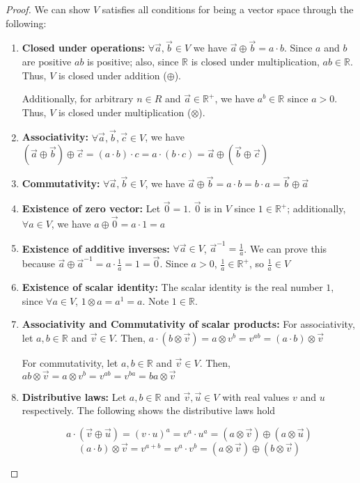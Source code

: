 \documentclass[11pt]{article}
\newcommand{\R}{\mathbb{R}}
\begin{document}
\begin{proof}
We can show $V$ satisfies all conditions for being a vector space through the following:

\begin{enumerate}

\item \textbf{Closed under operations:} $\forall \vec{a}, \vec{b} \in V$ we have $\vec{a}\oplus \vec{b} = a \cdot b$. Since $a$ and $b$ are positive $ab$ is positive; also, since $\R$ is closed under multiplication, $ab \in \R$. Thus, $V$ is closed under addition ($\oplus$).

Additionally, for arbitrary $n \in R$ and $\vec{a}\in \R^+$, we have $a^b \in \R$ since $a>0$. Thus, $V$ is closed under multiplication ($\otimes$).

\item \textbf{Associativity:} $\forall \vec{a}, \vec{b}, \vec{c} \in V$, we have $(\vec{a}\oplus \vec{b}) \oplus \vec{c} = (a\cdot b)\cdot c = a\cdot (b\cdot c) = \vec{a}\oplus (\vec{b} \oplus \vec{c})$ 

\item \textbf{Commutativity:} $\forall \vec{a}, \vec{b} \in V$, we have $\vec{a} \oplus \vec{b} = a\cdot b = b \cdot a = \vec{b} \oplus \vec{a}$ 

\item \textbf{Existence of zero vector:} Let $\vec{0} = 1$. $\vec{0}$ is in $V$ since $1\in \R^+$; additionally, $\forall a \in V$, we have $a \oplus \vec{0} = a \cdot 1 = a$

\item \textbf{Existence of additive inverses:} $\forall \vec{a} \in V$, $\vec{a}^{-1}=\frac{1}{a}$. We can prove this because $\vec{a} \oplus \vec{a}^{-1} = a \cdot \frac{1}{a} = 1 = \vec{0}$. Since $a > 0$, $\frac{1}{a} \in \R^{+}$, so $\frac{1}{a} \in V$

\item \textbf{Existence of scalar identity:} The scalar identity is the real number $1$, since $\forall a \in V$, $1 \otimes a = a^1 = a$. Note $1 \in \R$.

\item \textbf{Associativity and Commutativity of scalar products:} For associativity, let $a, b \in \R$ and $\vec{v} \in V$. Then, $a\cdot (b \otimes \vec{v}) = a \otimes v^{b} = v^{ab} = (a\cdot b) \otimes \vec{v}$ 

For commutativity, let $a, b \in \R$ and $\vec{v} \in V$. Then, $ab \otimes \vec{v} = a \otimes v^{b} = v^{ab} = v^{ba} = ba \otimes \vec{v}$

\item \textbf{Distributive laws:} Let $a, b \in \R$ and $\vec{v}, \vec{u} \in V$ with real values $v$ and $u$ respectively. The following shows the distributive laws hold

$$
a \cdot (\vec{v} \oplus \vec{u}) = (v\cdot u)^{a} = v^{a}\cdot u^{a} = (a \otimes \vec{v}) \oplus (a \otimes \vec{u} )
$$
$$
(a \cdot b)\otimes \vec{v} = v^{a+b} = v^{a} \cdot v^{b} = (a\otimes \vec{v}) \oplus (b\otimes \vec{v})
$$

\end{enumerate}
\end{proof}
\end{document}
